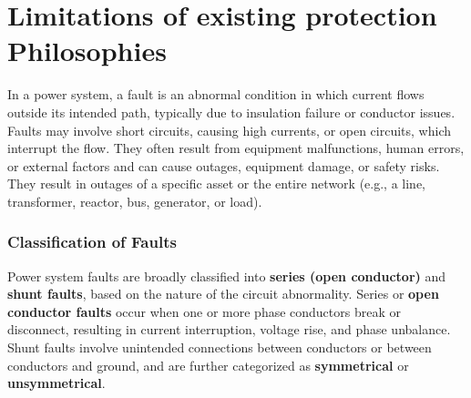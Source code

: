 \chapter{Limitations of existing protection Philosophies}



In a power system, a fault is an abnormal condition in which current flows outside its intended path, typically due to insulation failure or conductor issues. Faults may involve short circuits, causing high currents, or open circuits, which interrupt the flow. They often result from equipment malfunctions, human errors, or external factors and can cause outages, equipment damage, or safety risks. They result in outages of a specific asset or the entire network (e.g., a line, transformer, reactor, bus, generator, or load).



\subsection{Classification of Faults}

Power system faults are broadly classified into \textbf{series (open conductor)} and \textbf{shunt faults}, based on the nature of the circuit abnormality.
Series or \textbf{open conductor faults} occur when one or more phase conductors break or disconnect, resulting in current interruption, voltage rise, and phase unbalance.
Shunt faults involve unintended connections between conductors or between conductors and ground, and are further categorized as \textbf{symmetrical} or \textbf{unsymmetrical}.

